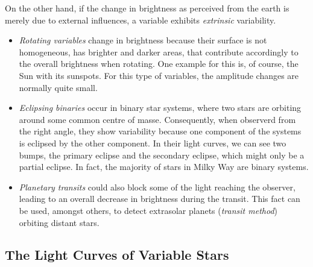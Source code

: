 On the other hand, if the change in brightness as perceived from the earth is merely due to external influences, a variable exhibits \emph{extrinsic} variability.

\begin{itemize}
\item \emph{Rotating variables} change in brightness because their surface is not homogeneous, \eg has brighter and darker areas, that contribute accordingly to the overall brightness when rotating. One example for this is, of course, the Sun with its sunspots. For this type of variables, the amplitude changes are normally quite small.
\item \emph{Eclipsing binaries} occur in binary star systems, where two stars are orbiting around some common centre of masse. Consequently, when observerd from the right angle, they show variability because one component of the systems is eclipsed by the other component. In their light curves, we can see two bumps, the primary eclipse and the secondary eclipse, which might only be a partial eclipse. In fact, the majority of stars in Milky Way are binary systems.
\item \emph{Planetary transits} could also block some of the light reaching the observer, leading to an overall decrease in brightness during the transit. This fact can be used, amongst others, to detect extrasolar planets (\emph{transit method}) orbiting distant stars.
\end{itemize}

\subsection{The Light Curves of Variable Stars}
\label{subsec:light-curves-variables}

